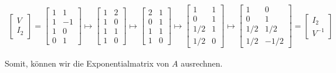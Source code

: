 \begin{solution}
\begin{align*}
    \begin{bmatrix}
        V \\
        \hline
        I_2
    \end{bmatrix}
    =
    \begin{bmatrix}
        1 &  1 \\
        1 & -1 \\
        \hline
        1 & 0 \\
        0 & 1
    \end{bmatrix}
    \mapsto
    \begin{bmatrix}
        1 & 2 \\
        1 & 0 \\
        \hline
        1 & 1 \\
        1 & 0
    \end{bmatrix}
    \mapsto
    \begin{bmatrix}
        2 & 1 \\
        0 & 1 \\
        \hline
        1 & 1 \\
        1 & 0
    \end{bmatrix}
    \mapsto
    \begin{bmatrix}
        1 & 1 \\
        0 & 1 \\
        \hline
        1/2 & 1 \\
        1/2 & 0
    \end{bmatrix}
    \mapsto
    \begin{bmatrix}
        1 & 0 \\
        0 & 1 \\
        \hline
        1/2 &  1/2 \\
        1/2 & -1/2
    \end{bmatrix}
    =
    \begin{bmatrix}
        I_2 \\
        \hline
        V^{-1}
    \end{bmatrix}
\end{align*}

Somit, können wir die Exponentialmatrix von $A$ ausrechnen.


\end{solution}
